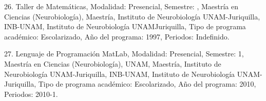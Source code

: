 26. Taller de Matemáticas, Modalidad: Presencial, Semestre: , Maestría en Ciencias (Neurobiología), 
Maestría, Instituto de Neurobiología UNAM-Juriquilla, INB-UNAM, Instituto de Neurobiología 
UNAMJuriquilla, Tipo de programa académico: Escolarizado, Año del programa: 1997, Periodos: 
Indefinido.

27. Lenguaje de Programación MatLab, Modalidad: Presencial, Semestre: 1, Maestría en Ciencias 
(Neurobiología), UNAM, Maestría, Instituto de Neurobiología UNAM-Juriquilla, INB-UNAM, Instituto de 
Neurobiología UNAM-Juriquilla, Tipo de programa académico: Escolarizado, Año del programa: 2010, 
Periodos: 2010-1.


